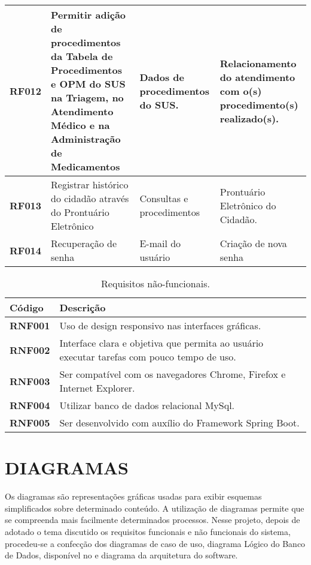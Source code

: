 \begin{longtable}[c]{|p{4.715em}|p{12em}|p{8.07em}|p{8.07em}|}
    \hline
    \textbf{RF012} & Permitir adição de procedimentos da Tabela de Procedimentos e OPM do SUS na Triagem, no Atendimento Médico e na Administração de Medicamentos  & Dados de procedimentos do SUS. & Relacionamento do atendimento com o(s) procedimento(s) realizado(s). \\
    \hline
    \textbf{RF013} & Registrar histórico do cidadão através do Prontuário Eletrônico  & Consultas e procedimentos & Prontuário Eletrônico do Cidadão. \\
    \hline
    \textbf{RF014} & Recuperação de senha & E-mail do usuário & Criação de nova senha \\
\end{longtable}

\begin{longtable}[c]{|p{4.715em}|p{29.5em}|}
\caption{Requisitos não-funcionais.\label{requisitosNaoFuncionais}}
\\

\hline
\textbf{Código} & \textbf{Descrição}\\
\hline
\endfirsthead
\endhead
\hline
\endfoot
\endlastfoot
    \textbf{RNF001} & Uso de design responsivo nas interfaces gráficas.\\
    \hline
    \textbf{RNF002} & Interface clara e objetiva que permita ao usuário executar tarefas com pouco tempo de uso.\\
    \hline
    \textbf{RNF003} & Ser compatível com os navegadores Chrome, Firefox e Internet Explorer.\\
    \hline
    \textbf{RNF004} & Utilizar banco de dados relacional MySql.\\
    \hline
    \textbf{RNF005} & Ser desenvolvido com auxílio do Framework Spring Boot.\\
    \hline
\end{longtable}

\section{DIAGRAMAS}

Os diagramas são representações gráficas usadas para exibir esquemas simplificados sobre determinado conteúdo. A utilização de diagramas permite que se compreenda mais facilmente determinados processos. Nesse projeto, depois de adotado o tema discutido os requisitos funcionais e não funcionais do sistema, procedeu-se a confecção dos diagramas de caso de uso, diagrama Lógico do Banco de Dados, disponível no  e diagrama da arquitetura do software.


